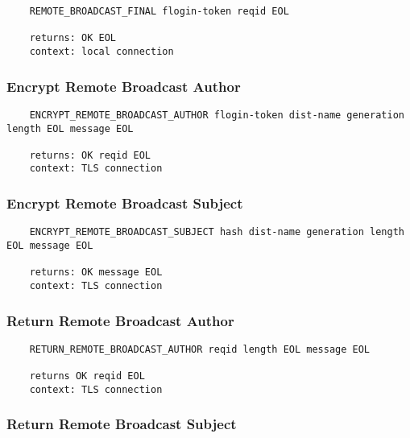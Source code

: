\documentclass[letterpaper,11pt,oneside]{article}
\begin{document}
\vspace{10pt}
\begin{verbatim}
    REMOTE_BROADCAST_FINAL flogin-token reqid EOL 

    returns: OK EOL
    context: local connection
\end{verbatim}
\vspace{10pt}

\subsubsection{Encrypt Remote Broadcast Author}

\vspace{10pt}
\begin{verbatim}
    ENCRYPT_REMOTE_BROADCAST_AUTHOR flogin-token dist-name generation length EOL message EOL

    returns: OK reqid EOL
    context: TLS connection
\end{verbatim}
\vspace{10pt}

\subsubsection{Encrypt Remote Broadcast Subject}

\vspace{10pt}
\begin{verbatim}
    ENCRYPT_REMOTE_BROADCAST_SUBJECT hash dist-name generation length EOL message EOL

    returns: OK message EOL
    context: TLS connection
\end{verbatim}
\vspace{10pt}

\subsubsection{Return Remote Broadcast Author}

\vspace{10pt}
\begin{verbatim}
    RETURN_REMOTE_BROADCAST_AUTHOR reqid length EOL message EOL

    returns OK reqid EOL
    context: TLS connection
\end{verbatim}
\vspace{10pt}

\subsubsection{Return Remote Broadcast Subject}
\end{document}
